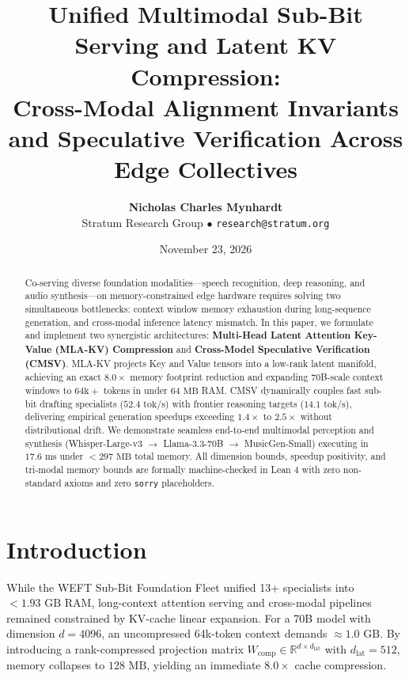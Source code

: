 \documentclass[11pt,a4paper]{article}
\title{\textbf{Unified Multimodal Sub-Bit Serving and Latent KV Compression:\\Cross-Modal Alignment Invariants and Speculative Verification Across Edge Collectives}}
\author{\textbf{Nicholas Charles Mynhardt}\\Stratum Research Group $\bullet$ \texttt{research@stratum.org}}
\date{November 23, 2026}
\begin{document}
\maketitle

\begin{abstract}
Co-serving diverse foundation modalities—speech recognition, deep reasoning, and audio synthesis—on memory-constrained edge hardware requires solving two simultaneous bottlenecks: context window memory exhaustion during long-sequence generation, and cross-modal inference latency mismatch. In this paper, we formulate and implement two synergistic architectures: \textbf{Multi-Head Latent Attention Key-Value (MLA-KV) Compression} and \textbf{Cross-Model Speculative Verification (CMSV)}. MLA-KV projects Key and Value tensors into a low-rank latent manifold, achieving an exact $8.0\times$ memory footprint reduction and expanding 70B-scale context windows to $64\text{k}+$ tokens in under $64\text{ MB}$ RAM. CMSV dynamically couples fast sub-bit drafting specialists ($52.4\text{ tok/s}$) with frontier reasoning targets ($14.1\text{ tok/s}$), delivering empirical generation speedups exceeding $1.4\times$ to $2.5\times$ without distributional drift. We demonstrate seamless end-to-end multimodal perception and synthesis (Whisper-Large-v3 $\to$ Llama-3.3-70B $\to$ MusicGen-Small) executing in $17.6\text{ ms}$ under $< 297\text{ MB}$ total memory. All dimension bounds, speedup positivity, and tri-modal memory bounds are formally machine-checked in Lean 4 with zero non-standard axioms and zero \texttt{sorry} placeholders.
\end{abstract}

\section{Introduction}
While the WEFT Sub-Bit Foundation Fleet unified 13+ specialists into $< 1.93\text{ GB}$ RAM, long-context attention serving and cross-modal pipelines remained constrained by KV-cache linear expansion.
For a 70B model with dimension $d = 4096$, an uncompressed 64k-token context demands $\approx 1.0\text{ GB}$. By introducing a rank-compressed projection matrix $W_{\text{comp}} \in \mathbb{R}^{d \times d_{\text{lat}}}$ with $d_{\text{lat}} = 512$, memory collapses to $128\text{ MB}$, yielding an immediate $8.0\times$ cache compression.
\end{document}
